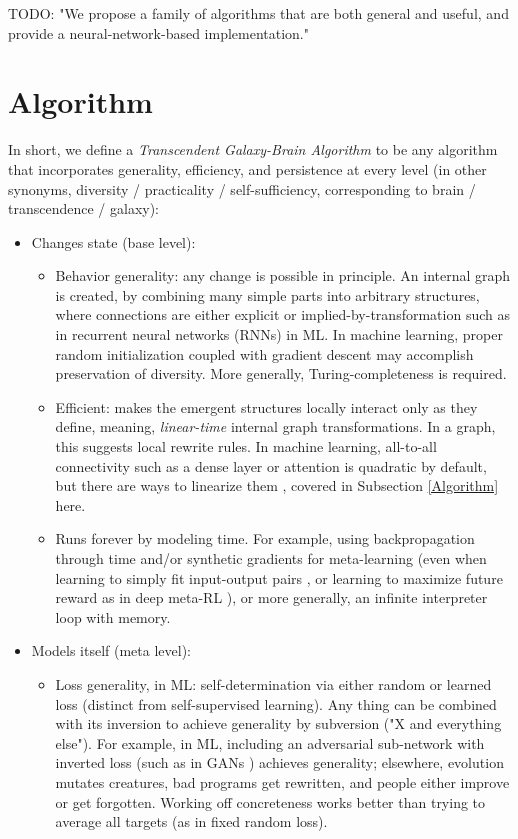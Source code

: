 \documentclass{article}
\begin{document}
    TODO: "We propose a family of algorithms that are both general and useful, and provide a neural-network-based implementation."

\section{Algorithm}

In short, we define a \textit{Transcendent Galaxy-Brain Algorithm} to be any algorithm that incorporates generality, efficiency, and persistence at every level (in other synonyms, diversity / practicality / self-sufficiency, corresponding to brain / transcendence / galaxy):

\begin{itemize}
\item Changes state (base level):
\begin{itemize}
\item Behavior generality: any change is possible in principle. An internal graph is created, by combining many simple parts into arbitrary structures, where connections are either explicit or implied-by-transformation such as in recurrent neural networks (RNNs) in ML. In machine learning, proper random initialization coupled with gradient descent may accomplish preservation of diversity. More generally, Turing-completeness is required.
\item Efficient: makes the emergent structures locally interact only as they define, meaning, \textit{linear-time} internal graph transformations. In a graph, this suggests local rewrite rules. In machine learning, all-to-all connectivity such as a dense layer or attention is quadratic by default, but there are ways to linearize them \cite{tolstikhin2021mlpmixer} \cite{schlag2021linear}, covered in Subsection \ref{Algorithm} here.
\item Runs forever by modeling time. For example, using backpropagation through time and/or synthetic gradients for meta-learning (even when learning to simply fit input-output pairs \cite{santoro2016oneshot}, or learning to maximize future reward as in deep meta-RL \cite{DBLP:journals/corr/WangKTSLMBKB16}), or more generally, an infinite interpreter loop with memory.
\end{itemize}
\item Models itself (meta level):
\begin{itemize}
\item Loss generality, in ML: self-determination via either random or learned loss (distinct from self-supervised learning). Any thing can be combined with its inversion to achieve generality by subversion ("X and everything else"). For example, in ML, including an adversarial sub-network with inverted loss (such as in GANs \cite{goodfellow2014generative}) achieves generality; elsewhere, evolution mutates creatures, bad programs get rewritten, and people either improve or get forgotten. Working off concreteness works better than trying to average all targets (as in fixed random loss).

\end{itemize}
\end{itemize}
\end{document}
